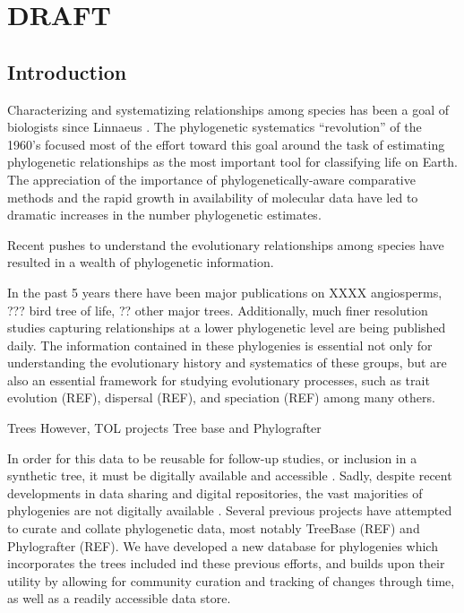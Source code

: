 \documentclass[a4paper,10pt]{article}
\begin{document}
\section{DRAFT}
\subsection{Introduction}
Characterizing and systematizing relationships among species has been a goal of biologists since Linnaeus \cite{Linne1758}.
The phylogenetic systematics ``revolution'' of the 1960's focused most of the effort toward this goal around the 
    task of estimating phylogenetic relationships as the most important tool for classifying life on Earth.
The appreciation of the importance of phylogenetically-aware comparative methods \citep[e.g.][]{Felsenstein1985Comp} and 
the rapid growth in availability of molecular data have led to dramatic increases in the number phylogenetic estimates.

Recent pushes to understand the evolutionary relationships among species have resulted in a wealth of phylogenetic information. 

In the past 5 years there have been major publications on XXXX angiosperms, ??? bird tree of life, ?? other major trees.
Additionally, much finer resolution studies capturing relationships at a lower phylogenetic level are being published daily.
The information contained in these phylogenies is essential not only for understanding the evolutionary history and systematics of these groups,
but are also an essential framework for studying evolutionary processes, such as trait evolution (REF), dispersal (REF), and speciation (REF)
among many others.

Trees 
     However,
     TOL projects
     Tree base and Phylografter

In order for this data to be reusable for follow-up studies, or inclusion in a synthetic tree, it must be digitally available and accessible \cite{cranston_best_2014}.
Sadly, despite recent developments in data sharing and digital repositories, the vast majorities of phylogenies are not digitally available \cite{Drew}.
Several previous projects have attempted to curate and collate phylogenetic data, most notably TreeBase (REF) and Phylografter (REF).
We have developed a new database for phylogenies which incorporates the trees included ind these previous efforts, 
and builds upon their utility by allowing for community curation and tracking of changes through time, as well as a readily accessible data store.
\end{document}
